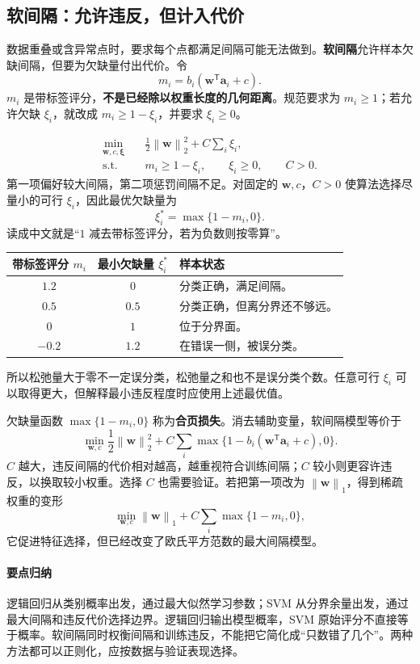 \documentclass[UTF8,fontset=fandol,a4paper,12pt]{ctexart}
\newcommand{\va}{\boldsymbol a}
\newcommand{\vw}{\boldsymbol w}
\newcommand{\norm}[1]{\left\lVert#1\right\rVert}
\theoremstyle{definition}
\begin{document}
\subsection{软间隔：允许违反，但计入代价}
数据重叠或含异常点时，要求每个点都满足间隔可能无法做到。\textbf{软间隔}允许样本欠缺间隔，但要为欠缺量付出代价。令
\[
 m_i=b_i(\vw^{\mathsf T}\va_i+c).
\]
$m_i$ 是带标签评分，\textbf{不是已经除以权重长度的几何距离}。规范要求为 $m_i\ge1$；若允许欠缺 $\xi_i$，就改成 $m_i\ge1-\xi_i$，并要求 $\xi_i\ge0$。

\[
 \boxed{\begin{aligned}
 \min_{\vw,c,\boldsymbol\xi}\quad&\frac12\norm{\vw}_2^2+C\sum_i\xi_i,\\
 \text{s.t.}\quad&m_i\ge1-\xi_i,\qquad\xi_i\ge0,\qquad C>0.
 \end{aligned}}
\]
第一项偏好较大间隔，第二项惩罚间隔不足。对固定的 $\vw,c$，$C>0$ 使算法选择尽量小的可行 $\xi_i$，因此最优欠缺量为
\[
 \xi_i^*=\max\{1-m_i,0\}.
\]
读成中文就是“$1$ 减去带标签评分，若为负数则按零算”。
\begin{center}
\begin{tabular}{ccl}
\toprule
带标签评分 $m_i$ & 最小欠缺量 $\xi_i^*$ & 样本状态\\
\midrule
$1.2$ & $0$ & 分类正确，满足间隔。\\
$0.5$ & $0.5$ & 分类正确，但离分界还不够远。\\
$0$ & $1$ & 位于分界面。\\
$-0.2$ & $1.2$ & 在错误一侧，被误分类。\\
\bottomrule
\end{tabular}
\end{center}
所以松弛量大于零不一定误分类，松弛量之和也不是误分类个数。任意可行 $\xi_i$ 可以取得更大，但解释最小违反程度时应使用上述最优值。

欠缺量函数 $\max\{1-m_i,0\}$ 称为\textbf{合页损失}。消去辅助变量，软间隔模型等价于
\[
 \min_{\vw,c}\frac12\norm{\vw}_2^2
 +C\sum_i\max\{1-b_i(\vw^{\mathsf T}\va_i+c),0\}.
\]
$C$ 越大，违反间隔的代价相对越高，越重视符合训练间隔；$C$ 较小则更容许违反，以换取较小权重。选择 $C$ 也需要验证。若把第一项改为 $\norm{\vw}_1$，得到稀疏权重的变形
\[
 \min_{\vw,c}\norm{\vw}_1+C\sum_i\max\{1-m_i,0\},
\]
它促进特征选择，但已经改变了欧氏平方范数的最大间隔模型。

\paragraph{要点归纳}
逻辑回归从类别概率出发，通过最大似然学习参数；SVM 从分界余量出发，通过最大间隔和违反代价选择边界。逻辑回归输出模型概率，SVM 原始评分不直接等于概率。软间隔同时权衡间隔和训练违反，不能把它简化成“只数错了几个”。两种方法都可以正则化，应按数据与验证表现选择。
\end{document}
